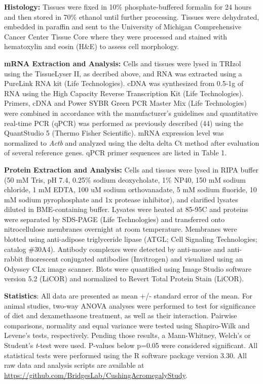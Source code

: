 \documentclass[11pt]{article} %
\begin{document}
\textbf{Histology:} Tissues were fixed in 10\% phosphate-buffered
formalin for 24 hours and then stored in 70\% ethanol until further
processing. Tissues were dehydrated, embedded in paraffin and sent to
the University of Michigan Comprehensive Cancer Center Tissue Core where
they were processed and stained with hematoxylin and eosin (H\&E) to
assess cell morphology.

\textbf{mRNA Extraction and Analysis:} Cells and tissues were lysed in
TRIzol using the TissueLyser II, as decribed above, and RNA was
extracted using a PureLink RNA kit (Life Technologies). cDNA was
synthesized from 0.5-1g of RNA using the High Capacity Reverse
Transcription Kit (Life Technologies). Primers, cDNA and Power SYBR
Green PCR Master Mix (Life Technologies) were combined in accordance
with the manufacturer's guidelines and quantitative real-time PCR (qPCR)
was performed as previously described (44) using the QuantStudio 5
(Thermo Fisher Scientific). mRNA expression level was normalized to
\emph{Actb} and analyzed using the delta delta Ct method after
evaluation of several reference genes. qPCR primer sequences are listed
in Table 1.

\textbf{Protein Extraction and Analysis:} Cells and tissues were lysed
in RIPA buffer (50 mM Tris, pH 7.4, 0.25\% sodium deoxycholate, 1\%
NP40, 150 mM sodium chloride, 1 mM EDTA, 100 uM sodium orthovanadate, 5
mM sodium fluoride, 10 mM sodium pyrophosphate and 1x protease
inhibitor), and clarified lysates diluted in BME-containing buffer.
Lysates were heated at 85-95\degree C and proteins were separated by SDS-PAGE
(Life Technologies) and transferred onto nitrocellulose membranes
overnight at room temperature. Membranes were blotted using anti-adipose
triglyceride lipase (ATGL; Cell Signaling Technologies; catalog \#30A4).
Antibody complexes were detected by anti-mouse and anti-rabbit
fluorescent conjugated antibodies (Invitrogen) and visualized using an
Odyssey CLx image scanner. Blots were quantified using Image Studio
software version 5.2 (LiCOR) and normalized to Revert Total Protein
Stain (LiCOR).

\textbf{Statistics}: All data are presented as mean +/- standard error
of the mean. For animal studies, two-way ANOVA analyses were performed
to test for significance of diet and dexamethasone treatment, as well as
their interaction. Pairwise comparisons, normality and equal variance
were tested using Shapiro-Wilk and Levene's tests, respectively. Pending
those results, a Mann-Whitney, Welch's or Student's \emph{t}-test were
used. P-values below p=0.05 were considered significant. All statistical
tests were performed using the R software package version 3.30. All raw
data and analysis scripts are available at
\url{https://github.com/BridgesLab/CushingAcromegalyStudy}.
\end{document}
